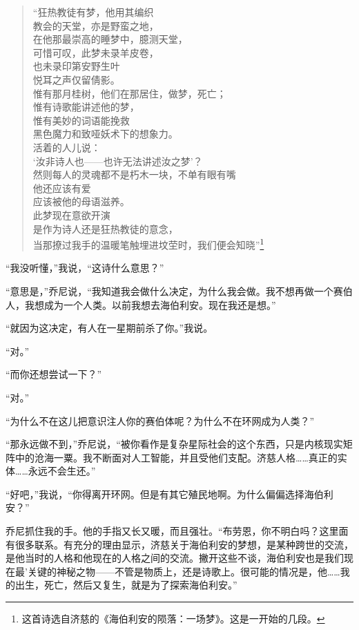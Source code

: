 \documentclass[AutoFakeBold=true]{book}
\begin{document}
\begin{quote}
	{\kaishu ``狂热教徒有梦，他用其编织\\
	教会的天堂，亦是野蛮之地，\\
	在他那最崇高的睡梦中，臆测天堂，\\
	可惜可叹，此梦未录羊皮卷，\\
	也未录印第安野生叶\\
	悦耳之声仅留倩影。\\
	惟有那月桂树，他们在那居住，做梦，死亡；\\
	惟有诗歌能讲述他的梦，\\
	惟有美妙的词语能挽救\\
	黑色魔力和致哑妖术下的想象力。\\
	活着的人儿说：\\
	`汝非诗人也——也许无法讲述汝之梦'？\\
	然则每人的灵魂都不是朽木一块，不单有眼有嘴\\
	他还应该有爱\\
	应该被他的母语滋养。\\
	此梦现在意欲开演\\
	是作为诗人还是狂热教徒的意念，\\
	当那撩过我手的温暖笔触埋进坟茔时，我们便会知晓''}\footnote{这首诗选自济慈的《海伯利安的陨落：一场梦》。这是一开始的几段。}
\end{quote}

``我没听懂，''我说，``这诗什么意思？''

``意思是，''乔尼说，``我知道我会做什么决定，为什么我会做。我不想再做一个赛伯人，我想成为一个人类。以前我想去海伯利安。现在我还是想。''

``就因为这决定，有人在一星期前杀了你。''我说。

``对。''

``而你还想尝试一下？''

``对。''

``为什么不在这儿把意识注人你的赛伯体呢？为什么不在环网成为人类？''

``那永远做不到，''乔尼说，``被你看作是复杂星际社会的这个东西，只是内核现实矩阵中的沧海一粟。我不断面对人工智能，并且受他们支配。济慈人格……真正的实体……永远不会生还。''

``好吧，''我说，``你得离开环网。但是有其它殖民地啊。为什么偏偏选择海伯利安？''

乔尼抓住我的手。他的手指又长又暖，而且强壮。``布劳恩，你不明白吗？这里面有很多联系。有充分的理由显示，济慈关于海伯利安的梦想，是某种跨世的交流，是他当时的人格和他现在的人格之间的交流。撇开这些不谈，海伯利安也是我们现在最'关键的神秘之物——不管是物质上，还是诗歌上。很可能的情况是，他……我的出生，死亡，然后又复生，就是为了探索海伯利安。''
\end{document}
